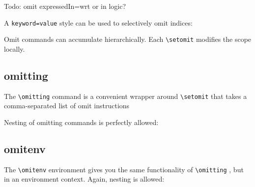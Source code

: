 \documentclass[10pt,a4paper]{article}
\begin{document}
Todo: omit expressedIn=wrt or in logic?

A \verb+keyword=value+ style can be used to selectively omit indices:
\begin{SideBySideExample}[xrightmargin=1cm,frame=single]
  {
    \AngularImpulse[object=1,wrt=0]
    \AngularImpulse[object=2,wrt=1]
  }
\end{SideBySideExample}

Omit commands can accumulate hierarchically. Each \verb=\setomit= modifies the scope locally.
\begin{SideBySideExample}[xrightmargin=1cm,frame=single]
\end{SideBySideExample}


\subsection{omitting}

The \verb+\omitting+ command is a convenient wrapper around \verb+\setomit+ that takes a comma-separated list of omit instructions

\begin{SideBySideExample}[xrightmargin=1cm,frame=single]
  \AngularImpulse[object=1,wrt=0,around=2]
\end{SideBySideExample}

Nesting of omitting commands is perfectly allowed:
\begin{SideBySideExample}[xrightmargin=1cm,frame=single]
  \AngularImpulse[object=1,wrt=0,around=2]
\end{SideBySideExample}

\subsection{omitenv}

The \verb+\omitenv+ environment gives you the same functionality of \verb+\omitting+ , but in an environment context. Again, nesting is allowed:
\end{document}
